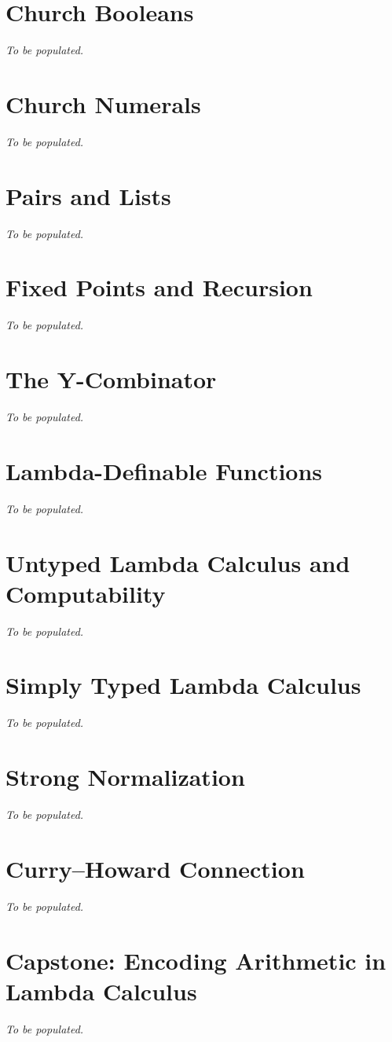 \section{Church Booleans}
\textit{To be populated.}

\section{Church Numerals}
\textit{To be populated.}

\section{Pairs and Lists}
\textit{To be populated.}

\section{Fixed Points and Recursion}
\textit{To be populated.}

\section{The Y-Combinator}
\textit{To be populated.}

\section{Lambda-Definable Functions}
\textit{To be populated.}

\section{Untyped Lambda Calculus and Computability}
\textit{To be populated.}

\section{Simply Typed Lambda Calculus}
\textit{To be populated.}

\section{Strong Normalization}
\textit{To be populated.}

\section{Curry--Howard Connection}
\textit{To be populated.}

\section{Capstone: Encoding Arithmetic in Lambda Calculus}
\textit{To be populated.}
